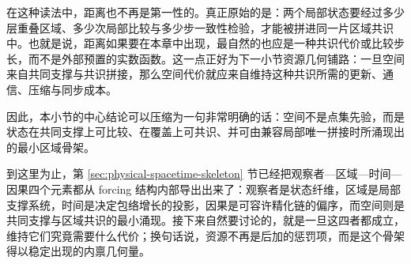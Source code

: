 在这种读法中，距离也不再是第一性的。真正原始的是：两个局部状态要经过多少层重叠区域、多少次局部比较与多少步一致性检验，才能被拼进同一片区域共识中。也就是说，距离如果要在本章中出现，最自然的也应是一种共识代价或比较步长，而不是外部预置的实数函数。这一点正好为下一小节资源几何铺路：一旦空间来自共同支撑与共识拼接，那么空间代价就应来自维持这种共识所需的更新、通信、压缩与同步成本。

因此，本小节的中心结论可以压缩为一句非常明确的话：空间不是点集先验，而是状态在共同支撑上可比较、在覆盖上可共识、并可由兼容局部唯一拼接时所涌现出的最小区域骨架。

到这里为止，第 \ref{sec:physical-spacetime-skeleton} 节已经把观察者—区域—时间—因果四个元素都从 forcing 结构内部导出出来了：观察者是状态纤维，区域是局部支撑系统，时间是决定包络增长的投影，因果是可容许精化链的偏序，而空间则是共同支撑与区域共识的最小涌现。接下来自然要讨论的，就是一旦这四者都成立，维持它们究竟需要什么代价；换句话说，资源不再是后加的惩罚项，而是这个骨架得以稳定出现的内禀几何量。
